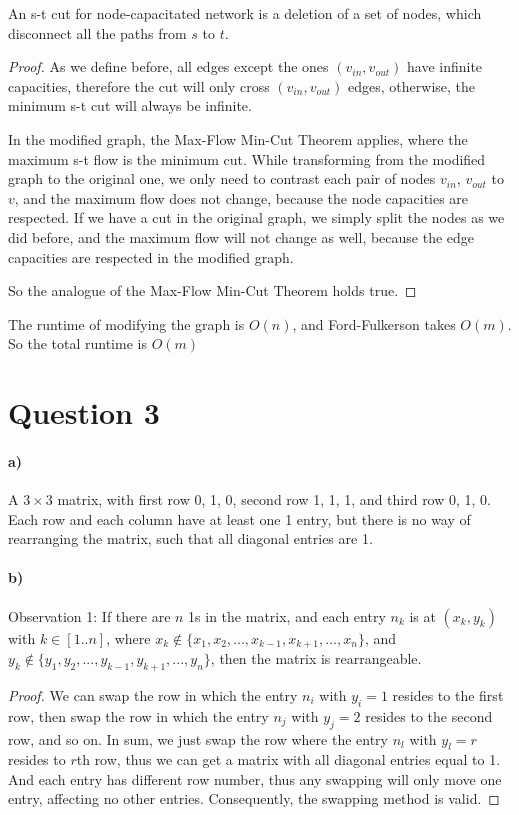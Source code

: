 \documentclass[letter,12pt]{article}
\begin{document}
An s-t cut for node-capacitated network is a deletion of a set of nodes,
which disconnect all the paths from $s$ to $t$.

\begin{proof}
As we define before, all edges except the ones $(v_{in}, v_{out})$ have infinite 
capacities, therefore the cut will only cross $(v_{in}, v_{out})$ edges, 
otherwise, the minimum s-t cut will always be infinite. 

In the modified graph, the Max-Flow Min-Cut Theorem applies, where the 
maximum s-t flow is the minimum cut. While transforming from the 
modified graph to the original one, we only need to contrast each pair of 
nodes $v_{in}$, $v_{out}$ to $v$, and the maximum flow does not change,
because the node capacities are respected.
If we have a cut in the original graph, we simply split the nodes as we did
before, and the maximum flow will not change as well, because the edge
capacities are respected in the modified graph. 

So the analogue of the Max-Flow Min-Cut Theorem holds true.
\end{proof} 

The runtime of modifying the graph is $O(n)$, and Ford-Fulkerson takes 
$O(m)$. So the total runtime is $O(m)$
\section*{Question 3}
\paragraph*{a)}
A $3 \times 3$ matrix, with first row 0, 1, 0, second row 1, 1, 1, and third
row 0, 1, 0. Each row and each column have at least one 1 entry, but there
is no way of rearranging the matrix, such that all diagonal entries are 1.

\paragraph*{b)}
Observation 1: If there are $n$ 1s  in the matrix, and each entry $n_k$ is 
at $(x_k, y_k)$ with $k \in [1..n]$, where $x_k \notin \{x_1, x_2, ..., x_{k-1}, 
x_{k+1},  ..., x_n\}$, and $y_k \notin \{y_1, y_2, ..., y_{k-1}, y_{k+1}, ..., 
y_n\}$, then the matrix is rearrangeable. 
\begin{proof}
We can swap the row in which the entry $n_i$ with $y_i = 1$ resides to the 
first row, then swap the row in which the entry $n_j$ with $y_j = 2$ 
resides to the second row, and so on. In sum, we just swap the row where 
the entry $n_l$ with $y_l = r$ resides to $r$th row, thus we can get a matrix
with all diagonal entries equal to 1. And each entry has different row 
number, thus any swapping will only move one entry, affecting no other
entries. Consequently, the swapping method is valid.
\end{proof}
 
\end{document}
